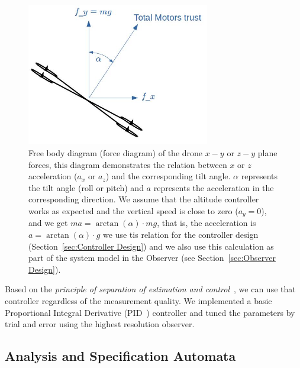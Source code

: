 \documentclass[ twoside, 12pt ]{article}
\begin{document}
\begin{figure} %
    \centerline{\includegraphics[width=80mm]{acceleration_static_diagram.jpg}}
    \caption{Free body diagram (force diagram) of the drone $x-y$ or $z-y$ plane forces, this diagram demonstrates the relation between $x$ or $z$ acceleration ($a_x$ or $a_z$) and the corresponding tilt angle. $\alpha$ represents the tilt angle (roll or pitch) and $a$ represents the acceleration in the corresponding direction. We assume that the altitude controller works as expected and the vertical speed is close to zero ($a_y = 0$), and we get $m a = \arctan(\alpha) \cdot mg$, that is, the acceleration is $a = \arctan(\alpha) \cdot g$ we use tis relation for the controller design (Section~\ref{sec:Controller Design}) and we also use this calculation as part of the system model in the Observer (see Section~\ref{sec:Observer Design}). }
    \label{fig:acceleration_static_diagram}
\end{figure}

Based on the \textit{principle of separation of estimation and control}~\cite{aastrom2012introduction}, we can use that controller regardless of the measurement quality. We implemented a basic Proportional Integral Derivative (PID~\cite{aastrom2006advanced}) controller and tuned the parameters by trial and error using the highest resolution observer.

\subsection{Analysis and Specification Automata}
\label{sec:Analysis}
\end{document}
